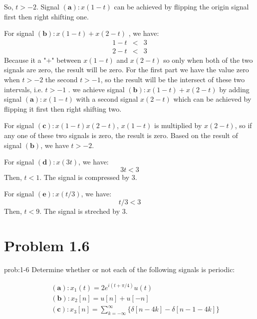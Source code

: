 \documentclass[koma,a4paper,utopia,12pt,listings-color,microtype,paralist,colorlinks,urlcolor=red]{org-article}
\begin{document}
So, \(t>-2\). Signal \(\mathbf{(a)}: x(1-t)\) can be achieved by flipping the
origin signal first then right shifting one.

For signal \(\mathbf{(b)}: x(1-t) + x(2-t)\) , we have:
\begin{eqnarray*}
1-t&< &3 \\
2-t&<& 3
\end{eqnarray*}
Because it a "\(+\)" between \(x(1-t)\) and \(x(2-t)\) so only when both of the
two signals are zero, the result will be zero. For the first part we have the
value zero when \(t>-2\) the second \(t>-1\), so the result will be the
intersect of these two intervals, i.e. \(t>-1\) . we achieve signal
\(\mathbf{(b)}: x(1-t) + x(2-t)\) by adding signal \(\mathbf{(a)}: x(1-t)\)
with a second signal \(x(2-t)\) which can be achieved by flipping it first then
right shifting two.


For signal \(\mathbf{(c)}: x(1-t)x(2-t)\), \(x(1-t)\) is multiplied by
\(x(2-t)\), so if any one of these two signals is zero, the result is zero.
Based on the result of signal \(\mathbf{( b )}\), we have \(t>-2\).

For signal \(\mathbf{( d )}: x(3t)\), we have:
\begin{equation*}
3t < 3
\end{equation*}
Then, \(t<1\). The signal is compressed by \(3\).

For signal \(\mathbf{( e )}: x(t/3)\), we have:
\begin{equation*}
t/3 < 3
\end{equation*}
Then, \(t<9\). The signal is streched by \(3\).

\section{Problem 1.6}
\label{sec:orgb735a47}

\begin{prob}[]{prob:1-6}
Determine whether or not each of the following signals is periodic:

\begin{eqnarray*}
&&  \mathbf{(a)}: x_{1}(t) = 2e^{i(t+\pi/4)}u(t) \\
&&  \mathbf{( b )}: x_{2}[n] = u[n] + u[-n]  \\
&&  \mathbf{(c)}: x_{3}[n] = \sum_{k=-\infty}^{\infty} \{ \delta[n-4k] - \delta[n-1-4k] \}
\end{eqnarray*}
\label{prob:1-6}
\end{prob}
\end{document}
